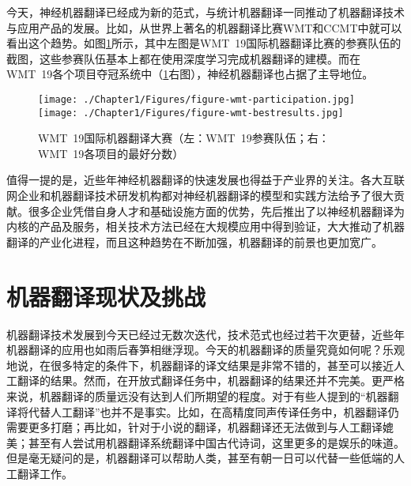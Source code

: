 \parinterval 今天，神经机器翻译已经成为新的范式，与统计机器翻译一同推动了机器翻译技术与应用产品的发展。比如，从世界上著名的机器翻译比赛WMT和CCMT中就可以看出这个趋势。如图\ref{fig:1-5}所示，其中左图是WMT\ 19国际机器翻译比赛的参赛队伍的截图，这些参赛队伍基本上都在使用深度学习完成机器翻译的建模。而在WMT\ 19各个项目夺冠系统中（\ref{fig:1-5}右图），神经机器翻译也占据了主导地位。

\begin{figure}[htp]
    \centering
\texttt{[image: ./Chapter1/Figures/figure-wmt-participation.jpg]}
\texttt{[image: ./Chapter1/Figures/figure-wmt-bestresults.jpg]}
\setlength{\belowcaptionskip}{-1.5em}
    \caption{WMT\ 19国际机器翻译大赛（左：WMT\ 19参赛队伍；右：WMT\ 19各项目的最好分数）}
    \label{fig:1-5}
\end{figure}

\parinterval 值得一提的是，近些年神经机器翻译的快速发展也得益于产业界的关注。各大互联网企业和机器翻译技术研发机构都对神经机器翻译的模型和实践方法给予了很大贡献。很多企业凭借自身人才和基础设施方面的优势，先后推出了以神经机器翻译为内核的产品及服务，相关技术方法已经在大规模应用中得到验证，大大推动了机器翻译的产业化进程，而且这种趋势在不断加强，机器翻译的前景也更加宽广。


\sectionnewpage
\section{机器翻译现状及挑战}
\parinterval 机器翻译技术发展到今天已经过无数次迭代，技术范式也经过若干次更替，近些年机器翻译的应用也如雨后春笋相继浮现。今天的机器翻译的质量究竟如何呢？乐观地说，在很多特定的条件下，机器翻译的译文结果是非常不错的，甚至可以接近人工翻译的结果。然而，在开放式翻译任务中，机器翻译的结果还并不完美。更严格来说，机器翻译的质量远没有达到人们所期望的程度。对于有些人提到的“机器翻译将代替人工翻译”也并不是事实。比如，在高精度同声传译任务中，机器翻译仍需要更多打磨；再比如，针对于小说的翻译，机器翻译还无法做到与人工翻译媲美；甚至有人尝试用机器翻译系统翻译中国古代诗词，这里更多的是娱乐的味道。但是毫无疑问的是，机器翻译可以帮助人类，甚至有朝一日可以代替一些低端的人工翻译工作。

